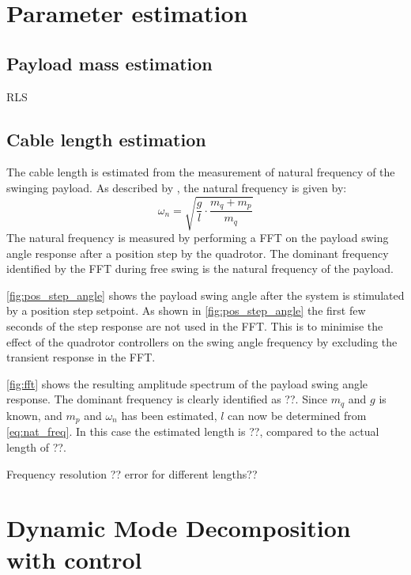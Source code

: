     
\section{Parameter estimation}
    \subsection{Payload mass estimation}
        RLS

    \subsection{Cable length estimation}
        The cable length is estimated from the measurement of natural frequency of the swinging payload.
        As described by
        \cite{bisgaard},
        the natural frequency is given by:
        \begin{equation} \label{eq:nat_freq}
            \omega_n = \sqrt{ \frac{g}{l} \cdot \frac{m_q + m_p}{m_q}}
        \end{equation}
        The natural frequency is measured by performing a FFT on the payload swing angle response after a position step by the quadrotor.
        The dominant frequency identified by the FFT during free swing is the natural frequency of the payload.
        
        \ref{fig:pos_step_angle}
        shows the payload swing angle after the system is stimulated by a position step setpoint.
        As shown in 
        \ref{fig:pos_step_angle}
        the first few seconds of the step response are not used in the FFT.
        This is to minimise the effect of the quadrotor controllers on the swing angle frequency 
        by excluding the transient response in the FFT.

        \ref{fig:fft} 
        shows the resulting amplitude spectrum of the payload swing angle response.
        The dominant frequency is clearly identified as ??.
        Since $m_q$ and $g$ is known, and $m_p$ and $\omega_n$ has been estimated, $l$ can now be determined from
        \ref{eq:nat_freq}.
        In this case the estimated length is ??, compared to the actual length of ??.
        
        Frequency resolution ??
        error for different lengths??
  
\section{Dynamic Mode Decomposition with control}
\label{sec:dmdc}        

